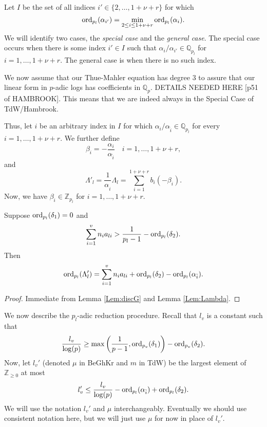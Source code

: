 Let $I$ be the set of all indices $i' \in \{2, \dots, 1+ \nu + r\}$ for which
\[\operatorname{ord}_{p_l}(\alpha_{i'}) = \min_{2\leq i\leq 1+ \nu+ r} \operatorname{ord}_{p_l}(\alpha_i).\]
We will identify two cases, the \textit{special case} and the \textit{general case}. The special case occurs when there is some index $i' \in I$ such that $\alpha_i/\alpha_{i'} \in \mathbb{Q}_{p_l}$ for $i = 1, \dots, 1+ \nu+ r$. The general case is when there is no such index. 

We now assume that our Thue-Mahler equation has degree $3$ to assure that our linear form in $p$-adic logs has coefficients in $\mathbb{Q}_p$. DETAILS NEEDED HERE [p51 of HAMBROOK]. This means that we are indeed always in the Special Case of TdW/Hambrook. 

Thus, let $\hat{i}$ be an arbitrary index in $I$ for which $\alpha_i/\alpha_{\hat{i}} \in \mathbb{Q}_{p_l}$ for every $i = 1, \dots, 1+ \nu+ r$. We further define
\[\beta_i = - \frac{\alpha_i}{\alpha_{\hat{i}}} \quad i = 1, \dots, 1+ \nu+ r,\]
and 
\[\Lambda'_l = \frac{1}{\alpha_{\hat{i}}}\Lambda_l = \sum_{i = 1}^{1+ \nu+ r} b_i(-\beta_i).\]
Now, we have $\beta_i \in \mathbb{Z}_{p_l}$ for $i = 1, \dots, 1+ \nu+ r$. 

\begin{lemma} \label{Lem:19.1}
Suppose $\operatorname{ord}_{p_l}(\delta_1) = 0$ and 
\[\sum_{i = 1}^v n_{i}a_{li} > \frac{1}{p_l-1} - \operatorname{ord}_{p_l}(\delta_2).\]
Then
\[\operatorname{ord}_{p_l}(\Lambda_l') = \sum_{i = 1}^v n_{i}a_{li} + \operatorname{ord}_{p_l}(\delta_2) - \operatorname{ord}_{p_l}(\alpha_{\hat{i}}).\]
\end{lemma}

\begin{proof}
Immediate from Lemma \ref{Lem:discG} and Lemma \ref{Lem:Lambda}. 
\end{proof}

We now describe the $p_l$-adic reduction procedure. Recall that $l_v$ is a constant such that
\[\frac{l_v}{\log(p)} \geq \max\left( \frac{1}{p-1}, \operatorname{ord}_{p_v}(\delta_1)\right) - \operatorname{ord}_{p_v}(\delta_2).\]
Now, let $l_v'$ (denoted $\mu$ in BeGhKr and $m$ in TdW) be the largest element of $\mathbb{Z}_{\geq 0}$ at most
\[l_v' \leq \frac{l_v}{\log(p)} - \operatorname{ord}_{p_l}(\alpha_{\hat{i}}) + \operatorname{ord}_{p_l}(\delta_2).\]
We will use the notation $l_v'$ and $\mu$ interchangeably. Eventually we should use consistent notation here, but we will just use $\mu$ for now in place of $l_v'$. 


